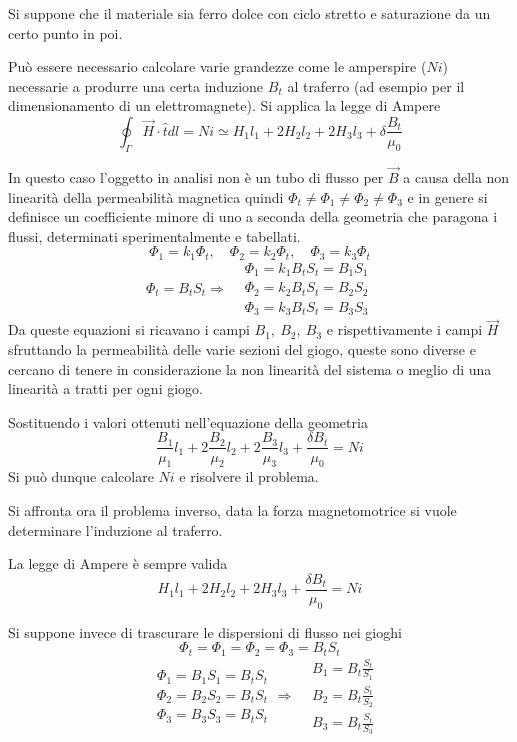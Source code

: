 Si suppone che il materiale sia ferro dolce con ciclo stretto e saturazione da un certo 
punto in poi.

Può essere necessario calcolare varie grandezze come
le amperspire ($Ni$) necessarie a produrre una certa induzione $B_t$ al traferro
(ad esempio per il dimensionamento di un elettromagnete).
Si applica la legge di Ampere
$$
\oint_\Gamma \vec{H}\cdot\hat{t}dl = Ni \simeq H_1l_1 + 2H_2l_2 +2H_3l_3+\delta \frac{B_t}{\mu_0}
$$

In questo caso l'oggetto in analisi non è un tubo di flusso per $\vec{B}$ a causa della 
non linearità della permeabilità magnetica quindi $\Phi_t \neq \Phi_1 \neq \Phi_2 \neq \Phi_3 $ e in genere si definisce un coefficiente minore di uno a seconda della geometria 
che paragona i flussi, determinati sperimentalmente e tabellati.
$$
\Phi_1 = k_1 \Phi_t,\quad \Phi_2 = k_2 \Phi_t,\quad \Phi_3 = k_3 \Phi_t
$$
$$
\Phi_t = B_tS_t \Rightarrow \begin{aligned}
&\Phi_1 = k_1 B_t S_t = B_1S_1\\
&\Phi_2 = k_2 B_t S_t = B_2S_2\\
&\Phi_3 = k_3 B_t S_t = B_3S_3
\end{aligned}
$$
Da queste equazioni si ricavano i campi $B_1,\ B_2,\ B_3$ e rispettivamente i campi
$\vec{H}$ sfruttando la permeabilità delle varie sezioni del giogo, queste sono 
diverse e cercano di tenere in considerazione la non linearità del sistema o meglio
di una linearità a tratti per ogni giogo.

Sostituendo i valori ottenuti nell'equazione della geometria
$$
\frac{B_1}{\mu_1}l_1 + 2\frac{B_2}{\mu_2}l_2 + 2\frac{B_3}{\mu_3}l_3 + \frac{\delta B_t}{\mu_0} = Ni
$$
Si può dunque calcolare $Ni$ e risolvere il problema.

Si affronta ora il problema inverso, data la forza magnetomotrice si vuole determinare
l'induzione al traferro.

La legge di Ampere è sempre valida
$$
H_1l_1 + 2H_2l_2 +2H_3l_3 + \frac{\delta B_t}{\mu_0} = Ni
$$

Si suppone invece di trascurare le dispersioni di flusso nei gioghi
$$
\Phi_t = \Phi_1 = \Phi_2 = \Phi_3 = B_tS_t
$$
$$
\begin{aligned}
&\Phi_1 = B_1S_1 = B_tS_t\\
&\Phi_2 = B_2S_2 = B_tS_t\\
&\Phi_3 = B_3S_3 = B_tS_t
\end{aligned}
\Rightarrow
\begin{aligned}
&B_1 = B_t\frac{S_t}{S_1} \\
&B_2 = B_t\frac{S_t}{S_2}\\
&B_3 = B_t\frac{S_t}{S_3}
\end{aligned}
$$

